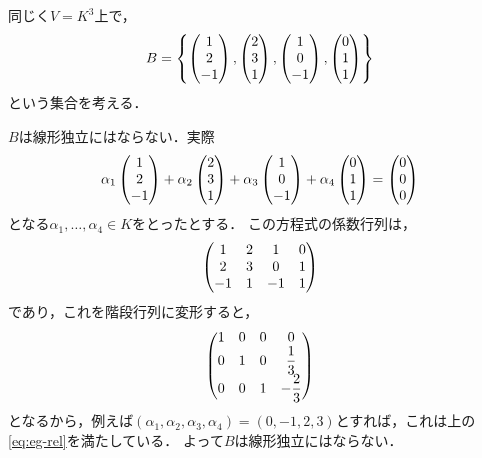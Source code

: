 \begin{example}
    同じく$V=K^3$上で，
    \[
        B = \left\{ \begin{pmatrix} 1 \\ 2 \\ -1 \end{pmatrix}, \begin{pmatrix} 2 \\ 3 \\ 1 \end{pmatrix}, \begin{pmatrix} 1 \\ 0 \\ -1 \end{pmatrix}, \begin{pmatrix} 0 \\ 1 \\ 1 \end{pmatrix}  \right\}
    \]
    という集合を考える．
    
    $B$は線形独立にはならない．実際
    \begin{equation}\label{eq:eg-rel}
        \alpha_1 \begin{pmatrix} 1 \\ 2 \\ -1 \end{pmatrix} + \alpha_2 \begin{pmatrix} 2 \\ 3 \\ 1 \end{pmatrix} + \alpha_3 \begin{pmatrix} 1 \\ 0 \\ -1 \end{pmatrix} + \alpha_4 \begin{pmatrix} 0 \\ 1 \\ 1 \end{pmatrix} = \begin{pmatrix} 0 \\ 0 \\ 0 \end{pmatrix}
    \end{equation}
    となる$\alpha_1,\dots,\alpha_4 \in K$をとったとする．
    この方程式の係数行列は，
    \[
        \begin{pmatrix} 1 & 2 & 1 & 0 \\ 2 & 3 & 0 & 1 \\ -1 & 1 & -1 & 1 \end{pmatrix}
    \]
    であり，これを階段行列に変形すると，
    \[
        \begin{pmatrix} 1 & 0 & 0 & 0 \\ 0 & 1 & 0 & \dfrac{1}{3} \\ 0 & 0 & 1 & -\dfrac{2}{3} \end{pmatrix}
    \]
    となるから，例えば$(\alpha_1,\alpha_2,\alpha_3,\alpha_4) = (0,-1,2,3)$とすれば，これは上の\eqref{eq:eg-rel}を満たしている．
    よって$B$は線形独立にはならない．
    

\end{example}
